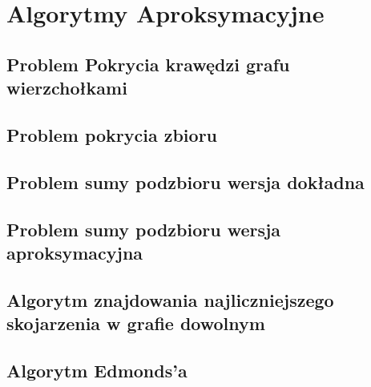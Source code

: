 \documentclass[11pt,a4paper]{article}
\begin{document}
\section{Algorytmy Aproksymacyjne}


\subsection{Problem Pokrycia krawędzi grafu wierzchołkami}


\subsection{Problem pokrycia zbioru}


\subsection{Problem sumy podzbioru wersja dokładna}


\subsection{Problem sumy podzbioru wersja aproksymacyjna}


\subsection{Algorytm znajdowania najliczniejszego skojarzenia w grafie dowolnym}


\subsection{Algorytm Edmonds'a}

\end{document}
